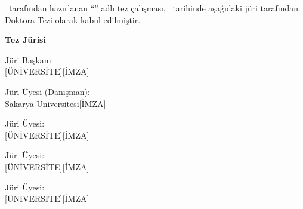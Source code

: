 \begingroup
\singlespacing

\TezYazari\ tarafından hazırlanan ``\TezBasligi'' adlı tez çalışması,
\SavunmaTarihi\ tarihinde aşağıdaki jüri tarafından Doktora Tezi olarak kabul edilmiştir.

\vspace{28mm}
\begin{center}\textbf{Tez Jürisi}\end{center}
\vspace{12mm}

\noindent Jüri Başkanı: \dotfill\\
\hspace*{38mm}[ÜNİVERSİTE]\hfill[İMZA]

\vspace{10mm}
\noindent Jüri Üyesi (Danışman): \Danisman\dotfill\\
\hspace*{38mm}Sakarya Üniversitesi\hfill[İMZA]

\vspace{10mm}
\noindent Jüri Üyesi: \dotfill\\
\hspace*{38mm}[ÜNİVERSİTE]\hfill[İMZA]

\vspace{10mm}
\noindent Jüri Üyesi: \dotfill\\
\hspace*{38mm}[ÜNİVERSİTE]\hfill[İMZA]

\vspace{10mm}
\noindent Jüri Üyesi: \dotfill\\
\hspace*{38mm}[ÜNİVERSİTE]\hfill[İMZA]

\endgroup

